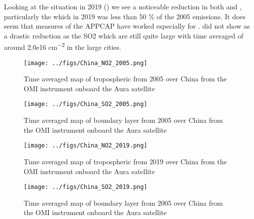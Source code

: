 Looking at the situation in 2019 () 
we see a noticeable reduction in both  and , particularly the  which 
in 2019 was less than 50 \% of the 2005 emissions. It does seem that measures of the APPCAP 
have worked especially for .  did not show as a drastic reduction as the \ch
{SO2}  which are still quite large with time averaged  of around 2.0e16 \si{cm^
{-2}} in the large cities. 
\begin{figure}[htpb]
    \centering
    \texttt{[image: ../figs/China\_NO2\_2005.png]}
    \caption{Time averaged map of tropospheric  from 2005 over China
    from the OMI instrument onboard the Aura satellite}
    \label{fig:OMI_ChinaNO2}
\end{figure}


\begin{figure}[htpb]
    \centering
    \texttt{[image: ../figs/China\_SO2\_2005.png]}
    \caption{Time averaged map of boundary layer from 2005 over China
    from the OMI instrument onboard the Aura satellite}
    \label{fig:OMI_China2005_SO2}
\end{figure}

\begin{figure}[htpb]
    \centering
        \texttt{[image: ../figs/China\_NO2\_2019.png]}
    \caption{Time averaged map of tropospheric  from 2019 
    over China from the OMI instrument  
    onboard the Aura satellite}
    \label{fig:OMI_China_2019NO2}
\end{figure}


\begin{figure}[htpb]
    \centering
    \texttt{[image: ../figs/China\_SO2\_2019.png]}
    \caption{Time averaged map of boundary layer from 2005 over China
    from the OMI instrument onboard the Aura satellite}
    \label{fig:OMI_China2019_SO2}
\end{figure}

